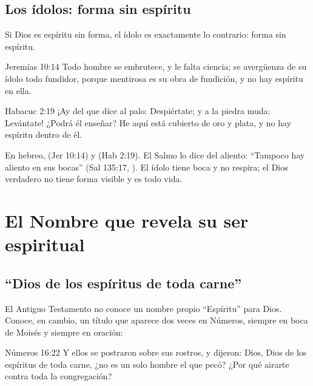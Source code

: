 
\subsection{Los ídolos: forma sin espíritu}

Si Dios es espíritu sin forma, el ídolo es exactamente lo contrario: forma sin espíritu.

\begin{verso}{Jeremías 10:14}
Todo hombre se embrutece, y le falta ciencia; se avergüenza de su ídolo todo fundidor, porque mentirosa es su obra de fundición, y no hay espíritu en ella.
\end{verso}

\begin{verso}{Habacuc 2:19}
¡Ay del que dice al palo: Despiértate; y a la piedra muda: Levántate! ¿Podrá él enseñar? He aquí está cubierto de oro y plata, y no hay espíritu dentro de él.
\end{verso}

En hebreo,  (Jer 10:14) y  (Hab 2:19). El Salmo lo dice del aliento: ``Tampoco hay aliento en sus bocas'' (Sal 135:17, ). El ídolo tiene boca y no respira; el Dios verdadero no tiene forma visible y es todo vida.


\section{El Nombre que revela su ser espiritual}

\subsection{“Dios de los espíritus de toda carne”}

El Antiguo Testamento no conoce un nombre propio ``Espíritu'' para Dios. Conoce, en cambio, un título que aparece dos veces en Números, siempre en boca de Moisés y siempre en oración:

\begin{verso}{Números 16:22}
Y ellos se postraron sobre sus rostros, y dijeron: Dios, Dios de los espíritus de toda carne, ¿no es un solo hombre el que pecó? ¿Por qué airarte contra toda la congregación?
\end{verso}

